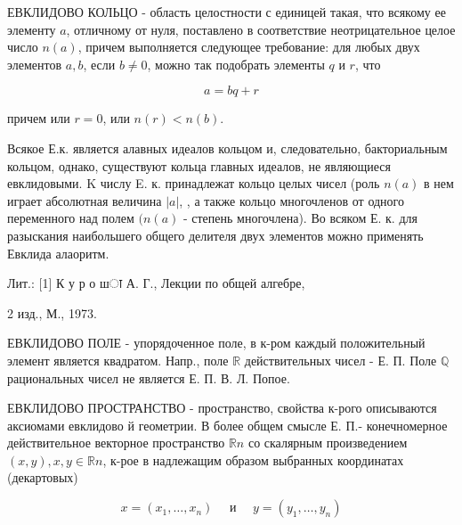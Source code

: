 \documentclass[10pt]{article}
\begin{document}
ЕВКЛИДОВО КОЛЬЦО - область целостности с единицей такая, что всякому ее элементу $a$, отличному от нуля, поставлено в соответствие неотрицательное целое число $n(a)$, причем выполняется следующее требование: для любых двух элементов $a, b$, если $b \neq 0$, можно так подобрать элементы $q$ и $r$, что



\[

a=b q+r

\]



причем или $r=0$, или $n(r)<n(b)$.



Всякое Е.к. является алавных идеалов кольцом и, следовательно, бакториальным кольцом, однако, существуют кольца главных идеалов, не являющиеся евклидовыми. $\mathrm{K}$ числу E. к. принадлежат кольцо целых чисел (роль $n(a)$ в нем играет абсолютная величина $|a|$, , а также кольцо многочленов от одного переменного над полем $(n(a)$ - степень многочлена). Во всяком Е. к. для разыскания наибольшего общего делителя двух элементов можно применять Евклида алаоритм.



Лит.: [1] К у р о шा А. Г., Лекции по общей алгебре,

2 изд., М., 1973.



ЕВКЛИДОВО ПОЛЕ - упорядоченное поле, в к-ром каждый положительный элемент является квадратом. Напр., поле $\mathbb{R}$ действительных чисел - Е. П. Поле $\mathbb{Q}$ рациональных чисел не является Е. П. В. Л. Попое.



ЕВКЛИДОВО ПРОСТРАНСТВО - пространство, свойства к-рого описываются аксиомами евклидово й геометрии. В более общем смысле Е. П.- конечномерное действительное векторное пространство $\mathbb{R} n$ со скалярным произведением $(x, y), x, y \in \mathbb{R} n$, к-рое в надлежащим образом выбранных координатах (декартовых)



\[

x=\left(x_{1}, \ldots, x_{n}\right) \quad \text { и } \quad y=\left(y_{1}, \ldots, y_{n}\right)

\]
\end{document}
